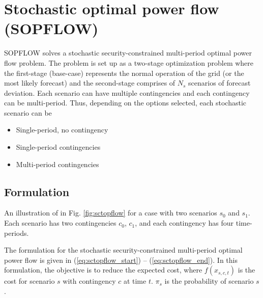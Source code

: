 \chapter{Stochastic optimal power flow (SOPFLOW)}\label{chap:sopflow}
SOPFLOW solves a stochastic security-constrained multi-period optimal power flow problem. The problem is set up as a two-stage optimization problem where the first-stage (base-case) represents the normal operation of the grid (or the most likely forecast) and the second-stage comprises of $N_s$ scenarios of forecast deviation. Each scenario can have multiple contingencies and each contingency can be multi-period. Thus, depending on the options selected, each stochastic scenario can be
\begin{itemize}
    \item Single-period, no contingency
    \item Single-period contingencies
    \item Multi-period contingencies
\end{itemize}

\section{Formulation}
An illustration of \sopflow in Fig. \ref{fig:sctopflow} for a case with two scenarios $s_0$ and $s_1$. Each scenario has two contingencies $c_0$, $c_1$, and each contingency has four time-periods.



The formulation for the stochastic security-constrained multi-period optimal power flow is given in (\ref{eq:sctopflow_start}) -- (\ref{eq:sctopflow_end}). In this formulation, the objective is to reduce the expected cost, where $f(x_{s,c,t})$ is the cost for scenario $s$ with contingency $c$ at time $t$. $\pi_s$ is the probability of scenario $s$.

